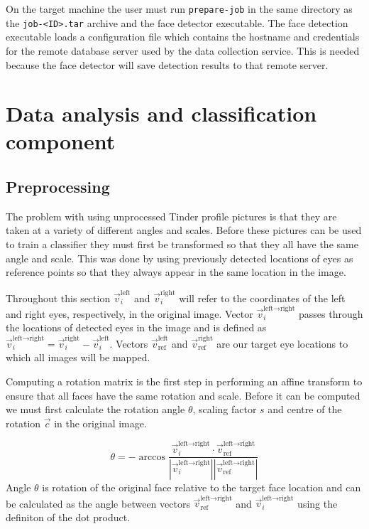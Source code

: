 On the target machine the user must run \texttt{prepare-job} in the same
directory as the \texttt{job-<ID>.tar} archive and the face detector
executable. The face detection executable loads a configuration file which
contains the hostname and credentials for the remote database server used by
the data collection service. This is needed because the face detector will save
detection results to that remote server.

\section{Data analysis and classification component}


\subsection{Preprocessing}
\label{spec:preproc}
\newcommand{\vleftright}{\vec{v}_i^{\text{left} \rightarrow \text{right}}}
\newcommand{\vi}[1]{\vec{v}_i^{\text{#1}}}
\newcommand{\vr}[1]{\vec{v}_{\text{ref}}^{\text{#1}}}
\newcommand{\vref}{\vec{v}_{\text{ref}}^{\text{left} \rightarrow \text{right}}}
The problem with using unprocessed Tinder profile pictures is that they are 
taken at a variety of different angles and scales. Before these pictures can 
be used to train a classifier they must first be transformed so that they all 
have the same angle and scale. This was done by using previously detected 
locations of eyes as reference points so that they always appear in the same 
location in the image. 

Throughout this section $\vi{left}$ and $\vi{right}$ will refer to the
coordinates of the left and right eyes, respectively, in the original image.
Vector $\vleftright$ passes through the locations of detected eyes in the image
and is defined as $\vleftright = \vi{right} - \vi{left}$. Vectors
$\vr{left}$ and $\vr{right}$ are our target eye locations to which all images
will be mapped.

Computing a rotation matrix is the first step in performing an affine transform
to ensure that all faces have the same rotation and scale. Before it can be 
computed we must first calculate the rotation angle $\theta$, scaling factor
$s$ and centre of the rotation $\vec{c}$ in the original image.

\begin{equation}
    \label{eq:spec:preproc:angle}
    \theta = -\arccos{\frac{\vleftright \cdot \vref}{|\vleftright| |\vref|}}
\end{equation}
Angle $\theta$ is rotation of the original face relative to the target face
location and can be calculated as the angle between vectors $\vref$ and
$\vleftright$ using the definiton of the dot product.

